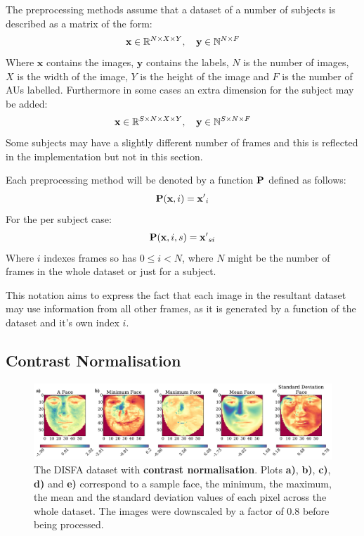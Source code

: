     The preprocessing methods assume that a dataset of a number of subjects
    is described as a matrix of the form:
    \begin{equation}
    {\bf x} \in \mathbb{R}^{N\times X \times Y},\quad {\bf y} \in \mathbb{N}^{N\times F}
    \end{equation}
    Where $\mathbf{x}$ contains the images, $\mathbf{y}$ contains the labels,
    $N$ is the number of images, $X$ is the width of the image, $Y$ is the height of the
    image and $F$ is the number of AUs labelled. Furthermore in some cases an extra dimension
    for the subject may be added:
    \begin{equation}
    {\bf x} \in \mathbb{R}^{S\times N\times X \times Y},\quad {\bf y} \in \mathbb{N}^{S\times N\times F}
    \end{equation}
    Some subjects may have a slightly different number of frames and this is reflected
    in the implementation but not in this section.

    Each preprocessing method will be denoted by a function ${\bf P}$ defined as follows:
    \begin{equation}
      {\bf P}({\bf x},i) = {\bf x'}_i
    \end{equation}
    For the per subject case:
    \begin{equation}
      {\bf P}({\bf x},i,s) = {\bf x'}_{si}
    \end{equation}
    Where $i$ indexes frames so has $0 \leq i < N$, where $N$ might be the number of frames
    in the whole dataset or just for a subject.

    This notation aims to express the fact that each image in the resultant dataset
    may use information from all other frames, as it is generated by a function of the dataset
    and it's own index $i$.

    \subsection{Contrast Normalisation}
      \begin{figure}[!h]
      \centering
      \includegraphics[width =\hsize]{figures/faces_contrast.pdf}
      \caption{The DISFA dataset with {\bf contrast normalisation}.
      Plots {\bf a)}, {\bf b)}, {\bf c)}, {\bf d)} and {\bf e)}
      correspond to a sample face, the minimum, the maximum,
      the mean and the standard deviation values of each pixel across
      the whole dataset. The images were downscaled by a factor of 0.8 before being processed.}
      \label{fig:fsdfhdfh}
      \end{figure}

